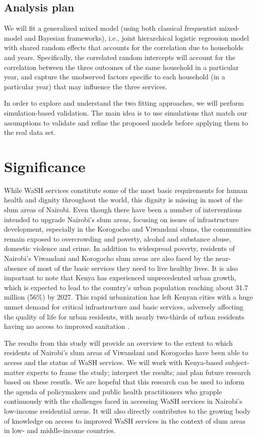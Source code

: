 \subsection*{Analysis plan}

We will fit a generalized mixed model (using both classical frequentist mixed-model and Bayesian frameworks), i.e., joint hierarchical logistic regression model with shared random effects that accounts for the correlation due to households and years. Specifically, the correlated random intercepts will account for the correlation between the three outcomes of the same household in a particular year, and capture the unobserved factors specific to each household (in a particular year) that may influence the three services.

In order to explore and understand the two fitting approaches, we will perform simulation-based validation.  The main idea is to use simulations that match our assumptions to validate and refine the proposed models before applying them to the real data set.

\section*{Significance}

While WaSH services constitute some of the most basic requirements for human health and dignity throughout the world, this dignity is missing in most of the slum areas of Nairobi. Even though there have been a number of interventions intended to upgrade Nairobi's slum areas, focusing on issues of infrastructure development, especially in the Korogocho and Viwandani slums, the communities remain exposed to overcrowding and poverty, alcohol and substance abuse, domestic violence and crime. In addition to widespread poverty, residents of Nairobi's Viwandani and Korogocho slum areas are also faced by the near-absence of most of the basic services they need to live healthy lives. It is also important to note that Kenya has experienced unprecedented urban growth, which is expected to lead to the country's urban population reaching about 31.7 million (56\%) by 2027. This rapid urbanization has left Kenyan cities with a huge unmet demand for critical infrastructure and basic services, adversely affecting the quality of life for urban residents, with nearly two-thirds of urban residents having no access to improved sanitation \citep{chikozho2019leaving}. 

The results from this study will provide an overview to the extent to which residents of Nairobi's slum areas of Viwandani and Korogocho have been able to access and the status of WaSH services. We will work with Kenya-based subject-matter experts to frame the study; interpret the results; and plan future research based on these resutls. We are hopeful that this research can be used to inform the agenda of policymakers and public health practitioners who grapple continuously with the challenges faced in accessing WaSH services in Nairobi's low-income residential areas. It will also directly contributes to the growing body of knowledge on access to improved WaSH services in the context of slum areas in low- and middle-income countries.

